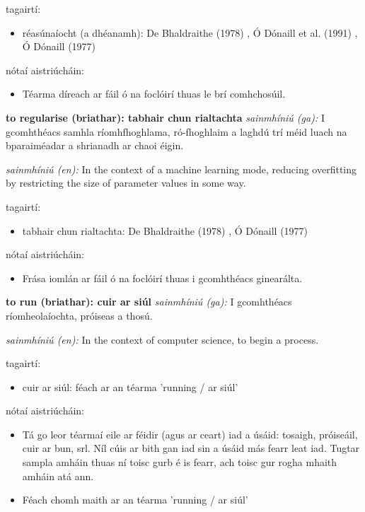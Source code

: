 \documentclass{article}
\begin{document}
tagairtí:
\begin{itemize}
	\item réasúnaíocht (a dhéanamh): De Bhaldraithe (1978) \cite{de-bhaldraithe}, Ó Dónaill et al. (1991) \cite{focloir-beag}, Ó Dónaill (1977) \cite{odonaill}
\end{itemize}

nótaí aistriúcháin:
\begin{itemize}
	\item Téarma díreach ar fáil ó na foclóirí thuas le brí comhchosúil.
\end{itemize}


\textbf{to regularise (briathar): tabhair chun rialtachta}
\textit{sainmhíniú (ga):} I gcomhthéacs samhla ríomhfhoghlama, ró-fhoghlaim a laghdú trí méid luach na bparaiméadar a shrianadh ar chaoi éigin.

\textit{sainmhíniú (en):} In the context of a machine learning mode, reducing overfitting by restricting the size of parameter values in some way.

tagairtí:
\begin{itemize}
	\item tabhair chun rialtachta: De Bhaldraithe (1978) \cite{de-bhaldraithe}, Ó Dónaill (1977) \cite{odonaill}
\end{itemize}

nótaí aistriúcháin:
\begin{itemize}
	\item Frása iomlán ar fáil ó na foclóirí thuas i gcomhthéacs ginearálta.
\end{itemize}


\textbf{to run (briathar): cuir ar siúl}
\textit{sainmhíniú (ga):} I gcomhthéacs ríomheolaíochta, próiseas a thosú.

\textit{sainmhíniú (en):} In the context of computer science, to begin a process.

tagairtí:
\begin{itemize}
	\item cuir ar siúl: féach ar an téarma 'running / ar siúl'
\end{itemize}

nótaí aistriúcháin:
\begin{itemize}
	\item Tá go leor téarmaí eile ar féidir (agus ar ceart) iad a úsáid: tosaigh, próiseáil, cuir ar bun, srl. Níl cúis ar bith gan iad sin a úsáid más fearr leat iad. Tugtar sampla amháin thuas ní toisc gurb é is fearr, ach toisc gur rogha mhaith amháin atá ann.
	\item Féach chomh maith ar an téarma 'running / ar siúl'
\end{itemize}
\end{document}
